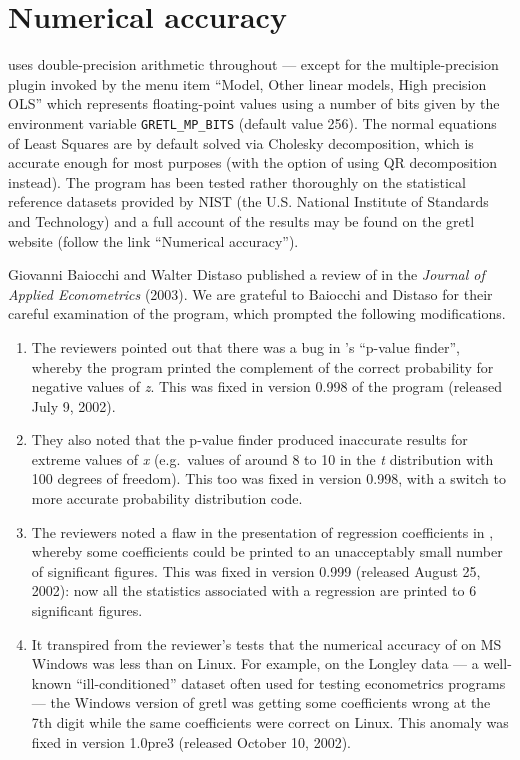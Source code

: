 \chapter{Numerical accuracy}
\label{app-accuracy}

 uses double-precision arithmetic throughout --- except for
the multiple-precision plugin invoked by the menu item ``Model, Other
linear models, High precision OLS'' which represents floating-point values using a number
of bits given by the environment variable \verb+GRETL_MP_BITS+
(default value 256).  The normal equations of Least Squares are by
default solved via Cholesky decomposition, which is accurate enough
for most purposes (with the option of using QR decomposition instead).
The program has been tested rather thoroughly on the statistical
reference datasets provided by NIST (the U.S. National Institute of
Standards and Technology) and a full account of the results may be
found on the gretl website (follow the link ``Numerical accuracy'').

Giovanni Baiocchi and Walter Distaso published a review of 
in the \emph{Journal of Applied Econometrics} (2003).  We are grateful
to Baiocchi and Distaso for their careful examination of the program,
which prompted the following modifications.

\begin{enumerate}
\item The reviewers pointed out that there was a bug in 's
  ``p-value finder'', whereby the program printed the complement of
  the correct probability for negative values of \emph{z}.  This was
  fixed in version 0.998 of the program (released July 9, 2002).
\item They also noted that the p-value finder produced inaccurate
  results for extreme values of \emph{x} (e.g.\ values of around 8 to
  10 in the \emph{t} distribution with 100 degrees of freedom).  This
  too was fixed in  version 0.998, with a switch to more
  accurate probability distribution code.
\item The reviewers noted a flaw in the presentation of regression
  coefficients in , whereby some coefficients could be
  printed to an unacceptably small number of significant figures.
  This was fixed in version 0.999 (released August 25, 2002): now all
  the statistics associated with a regression are printed to 6
  significant figures.
\item It transpired from the reviewer's tests that the numerical
  accuracy of  on MS Windows was less than on Linux.  For
  example, on the Longley data --- a well-known ``ill-conditioned''
  dataset often used for testing econometrics programs --- the Windows
  version of gretl was getting some coefficients wrong at the 7th
  digit while the same coefficients were correct on Linux.  This
  anomaly was fixed in  version 1.0pre3 (released October
  10, 2002).
\end{enumerate}


